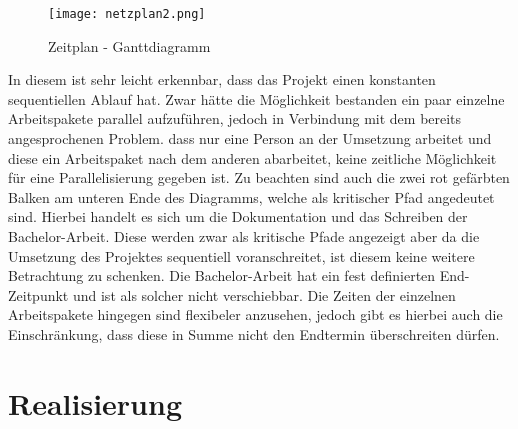 \begin{figure}[H]
\centering
\texttt{[image: netzplan2.png]}
\caption{Zeitplan - Ganttdiagramm}
\label{fig:benchsnmpbulk}
\end{figure}

In diesem ist sehr leicht erkennbar, dass das Projekt einen konstanten sequentiellen Ablauf hat.
Zwar hätte die Möglichkeit bestanden ein paar einzelne Arbeitspakete parallel aufzuführen, jedoch in Verbindung mit dem bereits angesprochenen Problem. dass nur eine Person an der Umsetzung arbeitet und diese ein Arbeitspaket nach dem anderen abarbeitet, keine zeitliche Möglichkeit für eine Parallelisierung gegeben ist.
Zu beachten sind auch die zwei rot gefärbten Balken am unteren Ende des Diagramms, welche als kritischer Pfad angedeutet sind. Hierbei handelt es sich um die Dokumentation und das Schreiben der Bachelor-Arbeit. Diese werden zwar als kritische Pfade angezeigt aber da die Umsetzung des Projektes sequentiell voranschreitet, ist diesem keine weitere Betrachtung zu schenken. Die Bachelor-Arbeit hat ein fest definierten End-Zeitpunkt und ist als solcher nicht verschiebbar. Die Zeiten der einzelnen Arbeitspakete hingegen sind flexibeler anzusehen, jedoch gibt es hierbei auch die Einschränkung, dass diese in Summe nicht den Endtermin überschreiten dürfen.

\section{Realisierung}
\label{sec:implementation}

